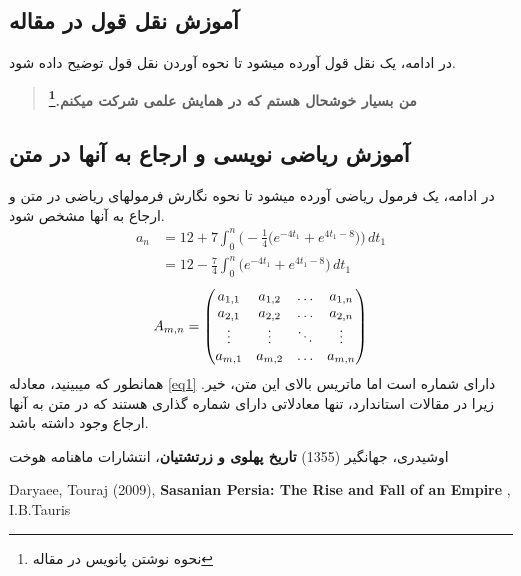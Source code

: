 \documentclass[twoside]{article}
\newcommand{\عنوان}{عنوان ارائه}
\newcommand{\نام}{نام و نام خانوادگی}
\newcommand{\رشته}{رشته}
\newcommand{\دانشگاه}{دانشگاه}
\newcommand{\همکار}{نام و نام خانوادگی همکار}
\begin{document}
\subsection{آموزش نقل قول در مقاله}
\noindent در ادامه، یک نقل قول آورده میشود تا نحوه آوردن نقل قول توضیح داده شود.
\begin{quote}\textbf{
من بسیار خوشحال هستم که در همایش علمی شرکت میکنم.\footnote{نحوه نوشتن پانویس در مقاله}
}\end{quote}
\subsection{آموزش ریاضی نویسی و ارجاع به آنها در متن}
\noindent در ادامه، یک فرمول ریاضی آورده میشود تا نحوه نگارش فرمولهای ریاضی در متن و ارجاع به آنها مشخص شود.
  \begin{equation}
  \begin{aligned}
\label{eq1}
a_n &= 12 + 7 \int_0^n\Big(-\frac{1}{4}\big(e^{-4t_1} + e^{4t_1 - 8}\big)\Big) \,dt_1 \\
      &= 12 - \frac{7}{4} \int_0^n\big(e^{-4t_1} + e^{4t_1 - 8}\big) \,dt_1
  \end{aligned}
  \end{equation}
  \begin{equation*}
A_{m,n} = \begin{pmatrix}  a_{1,1} & a_{1,2} & \ldots & a_{1,n} \\ a_{2,1} & a_{2,2} & \ldots & a_{2,n} \\  {\normalsize \vdots} &  {\normalsize \vdots} & {\normalsize \ddots} &  {\normalsize \vdots} \\ a_{m,1} & a_{m,2} & \ldots & a_{m,n} \\  \end{pmatrix}
  \end{equation*}
همانطور که میبینید، معادله \ref{eq1} دارای شماره است اما ماتریس بالای این متن، خیر. زیرا در مقالات استاندارد، تنها معادلاتی دارای شماره گذاری هستند که در متن به آنها ارجاع وجود داشته باشد.
\newpage

\begin{thebibliography}{100}
 اوشیدری، جهانگیر (1355) \textbf{تاریخ پهلوی و زرتشتیان}، انتشارات ماهنامه هوخت
\begin{latin}
 Daryaee, Touraj (2009), \textbf{Sasanian Persia: The Rise and Fall of an Empire} , I.B.Tauris

\end{latin} 

\end{thebibliography}
\end{document}
